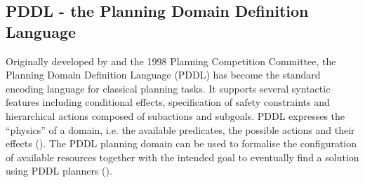 \subsection{PDDL - the Planning Domain Definition Language}\label{subsec:PDDL}
Originally developed by \cite{mcdermott1998pddl} and the 1998 Planning Competition Committee, the Planning Domain Definition Language (PDDL) has become the standard encoding language for classical planning tasks. It supports several syntactic features including conditional effects, specification of safety constraints and hierarchical actions composed of subactions and subgoals. PDDL expresses the ``physics'' of a domain, i.e. the available predicates, the possible actions and their effects (\cite{mcdermott1998pddl}).
The PDDL planning domain can be used to formalise the configuration of available resources together with the intended goal to eventually find a solution using PDDL planners  (\cite{huckaby2013planning}). 
%

